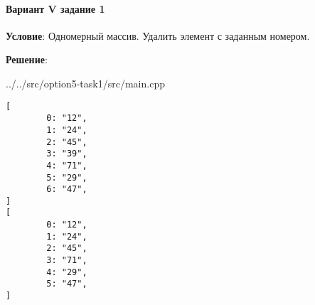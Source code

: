 \paragraph{Вариант V задание 1} \hspace{0pt}

\textbf{Условие}:
Одномерный массив.
Удалить элемент с заданным номером.

\textbf{Решение}:


{../../src/option5-task1/src/main.cpp}

\begin{lstlisting}[language=Out,]
[
        0: "12",
        1: "24",
        2: "45",
        3: "39",
        4: "71",
        5: "29",
        6: "47",
]
[
        0: "12",
        1: "24",
        2: "45",
        3: "71",
        4: "29",
        5: "47",
]
\end{lstlisting}